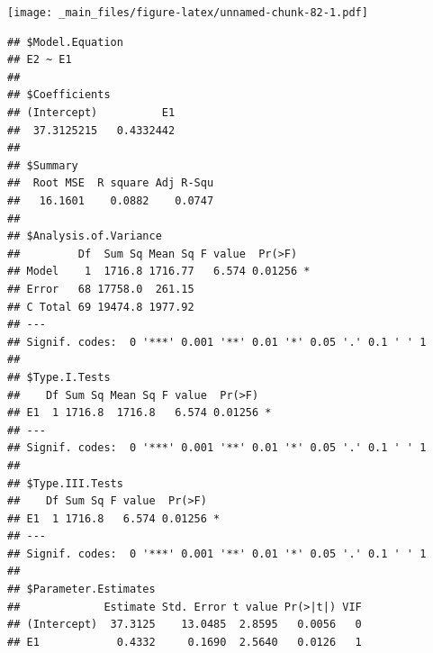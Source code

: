 \documentclass[
]{book}
\newenvironment{Shaded}{\begin{snugshade}}{\end{snugshade}}
\newcommand{\AttributeTok}[1]{\textcolor[rgb]{0.77,0.63,0.00}{#1}}
\newcommand{\DecValTok}[1]{\textcolor[rgb]{0.00,0.00,0.81}{#1}}
\newcommand{\FunctionTok}[1]{\textcolor[rgb]{0.00,0.00,0.00}{#1}}
\newcommand{\NormalTok}[1]{#1}
\newcommand{\SpecialCharTok}[1]{\textcolor[rgb]{0.00,0.00,0.00}{#1}}
\begin{document}
\begin{Shaded}
\end{Shaded}

\texttt{[image: \_main\_files/figure-latex/unnamed-chunk-82-1.pdf]}

\begin{verbatim}
## $Model.Equation
## E2 ~ E1
## 
## $Coefficients
## (Intercept)          E1 
##  37.3125215   0.4332442 
## 
## $Summary
##  Root MSE  R square Adj R-Squ 
##   16.1601    0.0882    0.0747 
## 
## $Analysis.of.Variance
##         Df  Sum Sq Mean Sq F value  Pr(>F)  
## Model    1  1716.8 1716.77   6.574 0.01256 *
## Error   68 17758.0  261.15                  
## C Total 69 19474.8 1977.92                  
## ---
## Signif. codes:  0 '***' 0.001 '**' 0.01 '*' 0.05 '.' 0.1 ' ' 1
## 
## $Type.I.Tests
##    Df Sum Sq Mean Sq F value  Pr(>F)  
## E1  1 1716.8  1716.8   6.574 0.01256 *
## ---
## Signif. codes:  0 '***' 0.001 '**' 0.01 '*' 0.05 '.' 0.1 ' ' 1
## 
## $Type.III.Tests
##    Df Sum Sq F value  Pr(>F)  
## E1  1 1716.8   6.574 0.01256 *
## ---
## Signif. codes:  0 '***' 0.001 '**' 0.01 '*' 0.05 '.' 0.1 ' ' 1
## 
## $Parameter.Estimates
##             Estimate Std. Error t value Pr(>|t|) VIF
## (Intercept)  37.3125    13.0485  2.8595   0.0056   0
## E1            0.4332     0.1690  2.5640   0.0126   1
\end{verbatim}
\end{document}
